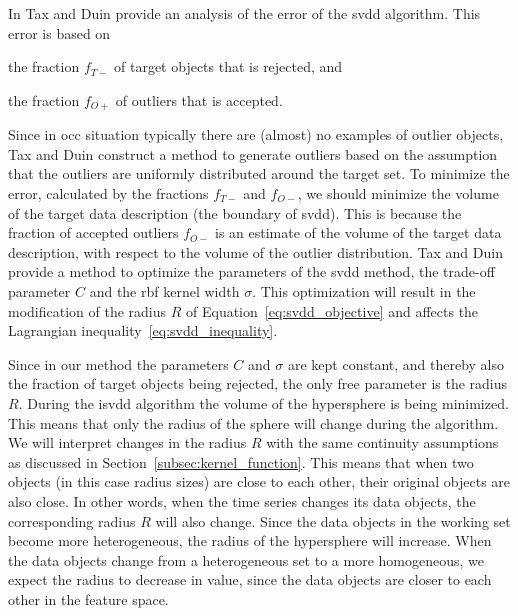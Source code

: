 In \cite{tax2002uniform} Tax and Duin provide an analysis of the error of the \gls{svdd} algorithm.
This error is based on
\begin{inparaenum}[\itshape 1\upshape)]
\item the fraction $f_{T-}$ of target objects that is rejected, and
\item the fraction $f_{O+}$ of outliers that is accepted.
\end{inparaenum}
Since in \gls{occ} situation typically there are (almost) no examples of outlier objects, Tax and Duin construct a method to generate outliers based on the assumption that the outliers are uniformly distributed around the target set.
To minimize the error, calculated by the fractions $f_{T-}$ and $f_{O-}$, we should minimize the volume of the target data description (\ie the boundary of \gls{svdd}).
This is because the fraction of accepted outliers $f_{O-}$ is an estimate of the volume of the target data description, with respect to the volume of the outlier distribution.
Tax and Duin provide a method to optimize the parameters of the \gls{svdd} method, \ie the trade-off parameter $C$ and the \gls{rbf} kernel width $\sigma$.
This optimization will result in the modification of the radius $R$ of Equation~\ref{eq:svdd_objective} and affects the Lagrangian inequality~\ref{eq:svdd_inequality}.

Since in our method the parameters $C$ and $\sigma$ are kept constant, and thereby also the fraction of target objects being rejected, the only free parameter is the radius $R$.
During the \gls{isvdd} algorithm the volume of the hypersphere is being minimized.
This means that only the radius of the sphere will change during the algorithm.
We will interpret changes in the radius $R$ with the same continuity assumptions as discussed in Section~\ref{subsec:kernel_function}.
This means that when two objects (in this case radius sizes) are close to each other, their original objects are also close.
In other words, when the time series changes its data objects, the corresponding radius $R$ will also change.
Since the data objects in the working set become more heterogeneous, the radius of the hypersphere will increase.
When the data objects change from a heterogeneous set to a more homogeneous, we expect the radius to decrease in value, since the data objects are closer to each other in the feature space.